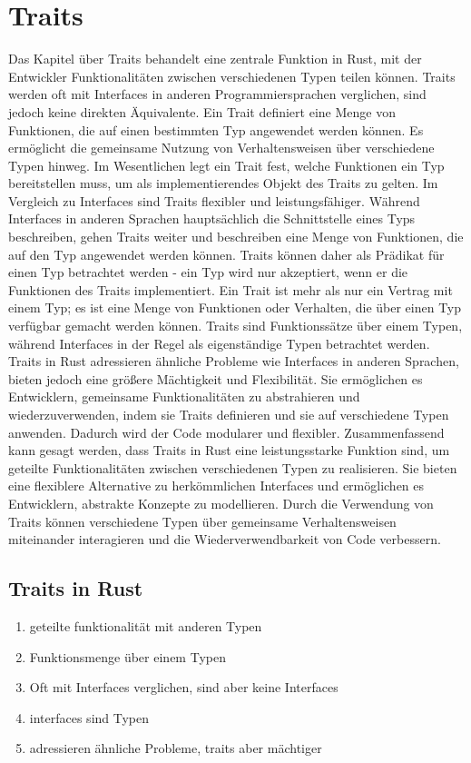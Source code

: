 \documentclass[a4paper, 1ppt]{article}
\begin{document}
\section{Traits}
Das Kapitel über Traits behandelt eine zentrale Funktion in Rust, mit der Entwickler Funktionalitäten zwischen verschiedenen Typen teilen können. Traits werden oft mit Interfaces in anderen Programmiersprachen verglichen, sind jedoch keine direkten Äquivalente.
Ein Trait definiert eine Menge von Funktionen, die auf einen bestimmten Typ angewendet werden können. Es ermöglicht die gemeinsame Nutzung von Verhaltensweisen über verschiedene Typen hinweg. Im Wesentlichen legt ein Trait fest, welche Funktionen ein Typ bereitstellen muss, um als implementierendes Objekt des Traits zu gelten.
Im Vergleich zu Interfaces sind Traits flexibler und leistungsfähiger. Während Interfaces in anderen Sprachen hauptsächlich die Schnittstelle eines Typs beschreiben, gehen Traits weiter und beschreiben eine Menge von Funktionen, die auf den Typ angewendet werden können. Traits können daher als Prädikat für einen Typ betrachtet werden - ein Typ wird nur akzeptiert, wenn er die Funktionen des Traits implementiert.
Ein Trait ist mehr als nur ein Vertrag mit einem Typ; es ist eine Menge von Funktionen oder Verhalten, die über einen Typ verfügbar gemacht werden können. Traits sind Funktionssätze über einem Typen, während Interfaces in der Regel als eigenständige Typen betrachtet werden.
Traits in Rust adressieren ähnliche Probleme wie Interfaces in anderen Sprachen, bieten jedoch eine größere Mächtigkeit und Flexibilität. Sie ermöglichen es Entwicklern, gemeinsame Funktionalitäten zu abstrahieren und wiederzuverwenden, indem sie Traits definieren und sie auf verschiedene Typen anwenden. Dadurch wird der Code modularer und flexibler.
Zusammenfassend kann gesagt werden, dass Traits in Rust eine leistungsstarke Funktion sind, um geteilte Funktionalitäten zwischen verschiedenen Typen zu realisieren. Sie bieten eine flexiblere Alternative zu herkömmlichen Interfaces und ermöglichen es Entwicklern, abstrakte Konzepte zu modellieren. Durch die Verwendung von Traits können verschiedene Typen über gemeinsame Verhaltensweisen miteinander interagieren und die Wiederverwendbarkeit von Code verbessern.
\subsection{Traits in Rust}
\begin{enumerate}
	\item geteilte funktionalität mit anderen Typen
	\item Funktionsmenge über einem Typen
	\item Oft mit Interfaces verglichen, sind aber keine Interfaces
	\item interfaces sind Typen
	\item adressieren ähnliche Probleme, traits aber mächtiger
\end{enumerate}
\end{document}

